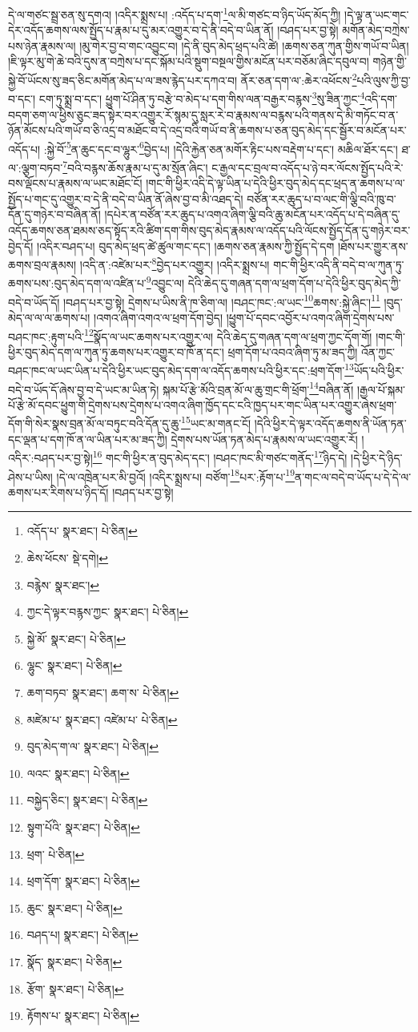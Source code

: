 དེ་ལ་གཙང་སྦྲ་ཅན་སུ་དགའ། །འདིར་སྨྲས་པ། :འདོད་པ་དག་\footnote{འདོད་པ་  སྣར་ཐང་།  པེ་ཅིན། }ལ་མི་གཙང་བ་ཉིད་ཡོད་མོད་ཀྱི། །དེ་ལྟ་ན་ཡང་གང་དེར་འདོད་ཆགས་ལས་སྤྱོད་པ་རྣམ་པ་དུ་མར་འགྱུར་བ་དེ་ནི་བདེ་བ་ཡིན་ནོ། །བཤད་པར་བྱ་སྟེ། མགོན་མེད་བཀྲེས་པས་ཉེན་རྣམས་ལ། །མུ་གེར་བྱ་བ་གང་འབྱུང་བ། །དེ་ནི་བུད་མེད་ཕྲད་པའི་ཚེ། །ཆགས་ཅན་ཀུན་གྱིས་གཡོ་བ་ཡིན། །ཇི་ལྟར་མུ་གེ་ཆེ་བའི་དུས་ན་བཀྲེས་པ་དང་སྐོམ་པའི་སྡུག་བསྔལ་གྱིས་མངོན་པར་བཅོམ་ཞིང་དབུལ་བ། གཉེན་གྱི་སྐྱེ་བོ་ཡོངས་སུ་ཟད་ཅིང་མགོན་མེད་པ་ལ་ཟས་རྙེད་པར་དཀའ་བ། ནོར་ཅན་དག་ལ་:ཆེར་འཕོངས་\footnote{ཆེས་ཕོངས་  སྡེ་དགེ། }པའི་ལུས་ཀྱི་བྱ་བ་དང་། ངག་ཏུ་སྨྲ་བ་དང་། ཕྱུག་པོ་ཤིན་ཏུ་བརྩེ་བ་མེད་པ་དག་གིས་ལན་བརྒྱར་བརྙས་\footnote{བརྙེས་  སྣར་ཐང་། }སུ་ཟིན་ཀྱང་\footnote{ཀྱང་དེ་ལྟར་བརྙས་ཀྱང་  སྣར་ཐང་།  པེ་ཅིན། }འདི་དག་བདག་ཅག་ལ་ཕྱིས་ཅུང་ཟད་སྟེར་བར་འགྱུར་རོ་སྙམ་དུ་སླར་རེ་བ་རྣམས་ལ་བརྙས་པའི་གནས་དེ་མི་གཏོང་བ་ན་ཉོན་མོངས་པའི་གཡོ་བ་ཅི་འདྲ་བ་མཐོང་བ་དེ་འདྲ་བའི་གཡོ་བ་ནི་ཆགས་པ་ཅན་བུད་མེད་དང་སྦྱོར་བ་མངོན་པར་འདོད་པ། :སྐྱེ་བོ་\footnote{སྐྱེ་མོ་  སྣར་ཐང་།  པེ་ཅིན། }ན་ཆུང་དང་བ་ལྷུར་\footnote{ལྷུང་  སྣར་ཐང་།  པེ་ཅིན། }བྱེད་པ། །དེའི་རྐྱེན་ཅན་མགོར་རྟིང་པས་བརྡེག་པ་དང་། མཆིལ་ཐོར་དང་། ཐ་ལ་:ལྕག་བཏབ་\footnote{ཆག་བཏབ་  སྣར་ཐང་། ཆག་ས་  པེ་ཅིན། }བའི་བརྙས་ཆོས་རྣམ་པ་དུ་མ་སྲོན་ཞིང་། ང་རྒྱལ་དང་བྲལ་བ་འདོད་པ་ཉེ་བར་ལོངས་སྤྱོད་པའི་རེ་བས་ལྡོངས་པ་རྣམས་ལ་ཡང་མཐོང་ངོ། །གང་གི་ཕྱིར་འདི་དེ་ལྟ་ཡིན་པ་དེའི་ཕྱིར་བུད་མེད་དང་ཕྲད་ན་ཆགས་པ་ལ་སྤྱོད་པ་གང་དུ་འགྱུར་བ་དེ་ནི་བདེ་བ་ཡིན་ནོ་ཞེས་བྱ་བ་མི་འཐད་དེ། བཙོན་རར་ཆུད་པ་བ་ལང་གི་ལྕི་བའི་ཁུ་བ་དོན་དུ་གཉེར་བ་བཞིན་ནོ། །དཔེར་ན་བཙོན་རར་ཆུད་པ་འགའ་ཞིག་ལྕི་བའི་ཆུ་མངོན་པར་འདོད་པ་དེ་བཞིན་དུ་འདོད་ཆགས་ཅན་ཐམས་ཅད་སྟོད་རའི་ཚིག་དག་གིས་བུད་མེད་རྣམས་ལ་འདོད་པའི་ལོངས་སྤྱོད་དོན་དུ་གཉེར་བར་བྱེད་དོ། །འདིར་བཤད་པ། བུད་མེད་ཕྲད་ཚེ་ཚུལ་གང་དང་། །ཆགས་ཅན་རྣམས་ཀྱི་སྤྱོད་དེ་དག །ཐོས་པར་གྱུར་ནས་ཆགས་བྲལ་རྣམས། །འདི་ན་:འཛེམ་པར་\footnote{མཛེམ་པ་  སྣར་ཐང་། འཛེམ་པ་  པེ་ཅིན། }བྱེད་པར་འགྱུར། །འདིར་སྨྲས་པ། གང་གི་ཕྱིར་འདི་ནི་བདེ་བ་ལ་ཀུན་ཏུ་ཆགས་པས་:བུད་མེད་དག་ལ་འཛིན་པ་\footnote{བུད་མེད་ག་ལ་  སྣར་ཐང་།  པེ་ཅིན། }འབྱུང་ལ། དེའི་ཆེད་དུ་གཞན་དག་ལ་ཕྲག་དོག་པ་དེའི་ཕྱིར་བུད་མེད་ཀྱི་བདེ་བ་ཡོད་དོ། །བཤད་པར་བྱ་སྟེ། དྲེགས་པ་ཡིས་ནི་ཁ་ཅིག་ལ། །བཤང་ཁང་:ལ་ཡང་\footnote{ལའང་  སྣར་ཐང་།  པེ་ཅིན། }ཆགས་:སྐྱེ་ཞིང་།\footnote{བསྐྱེད་ཅིང་།  སྣར་ཐང་།  པེ་ཅིན། } །བུད་མེད་ལ་ལ་ལ་ཆགས་པ། །འགའ་ཞིག་འགའ་ལ་ཕྲག་དོག་བྱེད། །ཕྱུག་པོ་དབང་འབྱོར་པ་འགའ་ཞིག་དྲེགས་པས་བཤང་ཁང་:རྟུག་པའི་\footnote{སྟུག་པོའི་  སྣར་ཐང་།  པེ་ཅིན། }སྣོད་ལ་ཡང་ཆགས་པར་འགྱུར་ལ། དེའི་ཆེད་དུ་གཞན་དག་ལ་ཕྲག་ཀྱང་དོག་གོ། །གང་གི་ཕྱིར་བུད་མེད་དག་ལ་ཀུན་ཏུ་ཆགས་པར་འགྱུར་བ་ཁོ་ན་དང་། ཕྲག་དོག་པ་འབའ་ཞིག་ཏུ་མ་ཟད་ཀྱི། འོན་ཀྱང་བཤང་ཁང་ལ་ཡང་ཡིན་པ་དེའི་ཕྱིར་ཡང་བུད་མེད་དག་ལ་འདོད་ཆགས་པའི་ཕྱིར་དང་:ཕྲག་དོག་\footnote{ཕྲག་  པེ་ཅིན། }ཡོད་པའི་ཕྱིར་བདེ་བ་ཡོད་དོ་ཞེས་བྱ་བ་དེ་ཡང་མ་ཡིན་ཏེ། སྐམ་པོ་རྩེ་མོའི་བྲན་མོ་ལ་ཆུ་གྲང་གི་ཕྲོག་\footnote{ཕྲག་དོག་  སྣར་ཐང་།  པེ་ཅིན། }བཞིན་ནོ། །རྒྱལ་པོ་སྐམ་པོ་རྩེ་མོ་དབང་ཕྱུག་གི་དྲེགས་པས་དྲེགས་པ་འགའ་ཞིག་ཁྱོད་དང་ངའི་ཁྱད་པར་གང་ཡིན་པར་འགྱུར་ཞེས་ཕྲག་དོག་གི་སེར་སྣས་བྲན་མོ་ལ་བཏུང་བའི་དོན་དུ་ཆུ་\footnote{ཆུང་  སྣར་ཐང་།  པེ་ཅིན། }ཡང་མ་གནང་ངོ། །དེའི་ཕྱིར་དེ་ལྟར་འདོད་ཆགས་ནི་ཡོན་ཏན་དང་ལྡན་པ་དག་ཁོ་ན་ལ་ཡིན་པར་མ་ཟད་ཀྱི། དྲེགས་པས་ཡོན་ཏན་མེད་པ་རྣམས་ལ་ཡང་འགྱུར་རོ། །འདིར་:བཤད་པར་བྱ་སྟེ།\footnote{བཤད་པ།  སྣར་ཐང་།  པེ་ཅིན། } གང་གི་ཕྱིར་ན་བུད་མེད་དང་། །བཤང་ཁང་མི་གཙང་གནོད་\footnote{སྣོད་  སྣར་ཐང་།  པེ་ཅིན། }ཉིད་དེ། །དེ་ཕྱིར་དེ་ཉིད་ཤེས་པ་ཡིས། །དེ་ལ་འཁྲེན་པར་མི་བྱའོ། །འདིར་སྨྲས་པ། བཙོག་\footnote{རྩོག་  སྣར་ཐང་།  པེ་ཅིན། }པར་:རྟོག་པ་\footnote{རྟོགས་པ་  སྣར་ཐང་།  པེ་ཅིན། }ན་གང་ལ་བདེ་བ་ཡོད་པ་དེ་དེ་ལ་ཆགས་པར་རིགས་པ་ཉིད་དོ། །བཤད་པར་བྱ་སྟེ། 